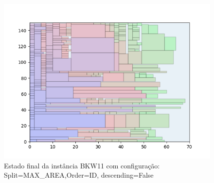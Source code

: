 \begin{figure}[H]
    \centering
    \caption[]{Estado final da instância BKW11 com configuração: Split=MAX_AREA,Order=ID, descending=False}
    \label{fig:bkw11-max_area-id-false}
    \includegraphics[scale=0.5]{output/figures/bkw/bkw11/max_area/id/false/000}
\end{figure}